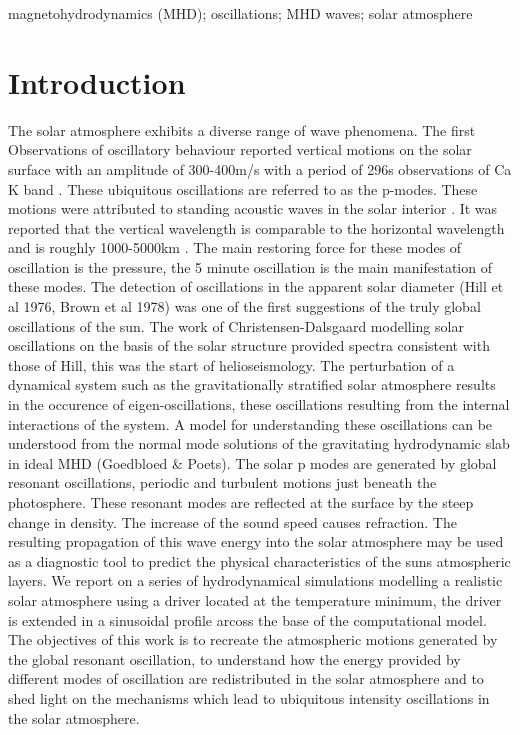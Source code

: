 \documentclass[final,1p]{elsarticle}
\begin{document}
\begin{keyword}
magnetohydrodynamics (MHD); oscillations; MHD waves; solar atmosphere
\end{keyword}
\maketitle




\section{Introduction}
\setcounter{equation}{0}
The solar atmosphere exhibits a diverse range of wave phenomena. The first Observations of oscillatory behaviour reported vertical motions on the solar surface with an amplitude of 300-400m/s with a period of 296s observations of Ca K band \cite{Leighton1960}. These ubiquitous oscillations are referred to as the p-modes.
These motions were attributed to standing acoustic waves in the solar interior \cite{Ulrich1970}. It was reported that the vertical wavelength is comparable to the horizontal wavelength and is roughly 1000-5000km \cite{Leibacher1971}.  The main restoring force for these modes of oscillation is the pressure, the 5 minute oscillation is the main manifestation of these modes. The detection of oscillations in the apparent solar diameter (Hill et al 1976, Brown et al 1978) was one of the first suggestions of the truly global oscillations of the sun.  The work of Christensen-Dalsgaard modelling solar oscillations on the basis of the solar structure provided spectra consistent with those of Hill, this was the start of helioseismology. The perturbation of a dynamical system such as the gravitationally stratified solar atmosphere results in the occurence of eigen-oscillations, these oscillations resulting from the internal interactions of the system. A model for understanding these oscillations can be understood from the normal mode solutions of the gravitating  hydrodynamic slab in ideal MHD (Goedbloed & Poets). The solar p modes are generated by global resonant oscillations, periodic  and turbulent motions just beneath the photosphere.  These resonant modes are reflected at the surface by the steep change in density. The increase of the sound speed causes refraction.   The resulting propagation of this wave energy into the solar atmosphere may be used as a diagnostic tool to predict the physical characteristics of the  suns atmospheric layers. We report on a series of hydrodynamical simulations modelling a realistic solar atmosphere using a driver located at the temperature minimum, the driver is extended in a sinusoidal profile arcoss the base of the computational model.  The objectives of this work is to recreate the atmospheric motions generated by the global resonant oscillation, to  understand how the energy provided by different modes of oscillation are redistributed in the solar atmosphere and to shed light on the mechanisms which lead to ubiquitous intensity oscillations in the solar atmosphere.   
\end{document}
